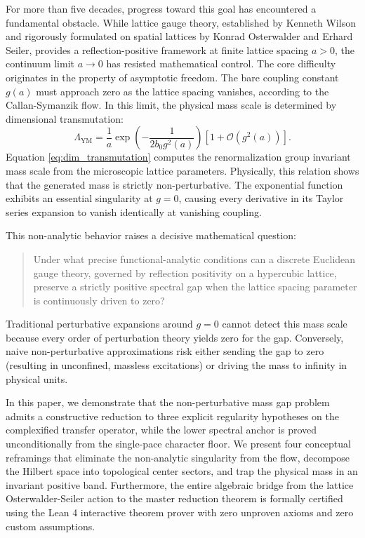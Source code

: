 \documentclass[11pt,reqno]{amsart}
\theoremstyle{plain}
\theoremstyle{definition}
\theoremstyle{remark}
\numberwithin{equation}{section}
\begin{document}
For more than five decades, progress toward this goal has encountered a fundamental obstacle. While lattice gauge theory, established by Kenneth Wilson and rigorously formulated on spatial lattices by Konrad Osterwalder and Erhard Seiler, provides a reflection-positive framework at finite lattice spacing $a > 0$, the continuum limit $a \to 0$ has resisted mathematical control. The core difficulty originates in the property of asymptotic freedom. The bare coupling constant $g(a)$ must approach zero as the lattice spacing vanishes, according to the Callan-Symanzik flow. In this limit, the physical mass scale is determined by dimensional transmutation:
\begin{equation}
\label{eq:dim_transmutation}
\Lambda_{\mathrm{YM}} = \frac{1}{a} \exp\left( - \frac{1}{2 b_0 g^2(a)} \right) \left[ 1 + \mathcal{O}(g^2(a)) \right].
\end{equation}
Equation \eqref{eq:dim_transmutation} computes the renormalization group invariant mass scale from the microscopic lattice parameters. Physically, this relation shows that the generated mass is strictly non-perturbative. The exponential function exhibits an essential singularity at $g = 0$, causing every derivative in its Taylor series expansion to vanish identically at vanishing coupling.

This non-analytic behavior raises a decisive mathematical question:
\begin{quote}
Under what precise functional-analytic conditions can a discrete Euclidean gauge theory, governed by reflection positivity on a hypercubic lattice, preserve a strictly positive spectral gap when the lattice spacing parameter is continuously driven to zero?
\end{quote}

Traditional perturbative expansions around $g = 0$ cannot detect this mass scale because every order of perturbation theory yields zero for the gap. Conversely, naive non-perturbative approximations risk either sending the gap to zero (resulting in unconfined, massless excitations) or driving the mass to infinity in physical units.

In this paper, we demonstrate that the non-perturbative mass gap problem admits a constructive reduction to three explicit regularity hypotheses on the complexified transfer operator, while the lower spectral anchor is proved unconditionally from the single-pace character floor. We present four conceptual reframings that eliminate the non-analytic singularity from the flow, decompose the Hilbert space into topological center sectors, and trap the physical mass in an invariant positive band. Furthermore, the entire algebraic bridge from the lattice Osterwalder-Seiler action to the master reduction theorem is formally certified using the Lean 4 interactive theorem prover with zero unproven axioms and zero custom assumptions.
\end{document}
